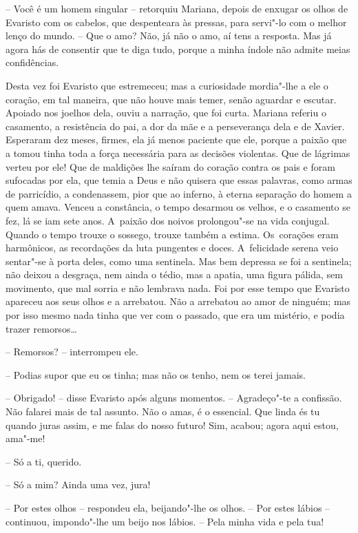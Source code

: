 -- Você é um homem singular -- retorquiu Mariana, depois de enxugar os
olhos de Evaristo com os cabelos, que despenteara às pressas, para
servi"-lo com o melhor lenço do mundo. -- Que o amo? Não, já não o amo,
aí tens a resposta. Mas já agora hás de consentir que te diga tudo,
porque a minha índole não admite meias confidências.

Desta vez foi Evaristo que estremeceu; mas a curiosidade mordia"-lhe a
ele o coração, em tal maneira, que não houve mais temer, senão aguardar
e escutar. Apoiado nos joelhos dela, ouviu a narração, que foi curta.
Mariana referiu o casamento, a resistência do pai, a dor da mãe e a
perseverança dela e de Xavier. Esperaram dez meses, firmes, ela já menos
paciente que ele, porque a paixão que a tomou tinha toda a força
necessária para as decisões violentas. Que de lágrimas verteu por ele!
Que de maldições lhe saíram do coração contra os pais e foram sufocadas
por ela, que temia a Deus e não quisera que essas palavras, como armas
de parricídio, a condenassem, pior que ao inferno, à eterna separação do
homem a quem amava. Venceu a constância, o tempo desarmou os velhos, e o
casamento se fez, lá se iam sete anos. A~paixão dos noivos prolongou"-se
na vida conjugal. Quando o tempo trouxe o sossego, trouxe também a
estima. Os~corações eram harmônicos, as recordações da luta pungentes e
doces. A~felicidade serena veio sentar"-se à porta deles, como uma
sentinela. Mas bem depressa se foi a sentinela; não deixou a desgraça,
nem ainda o tédio, mas a apatia, uma figura pálida, sem movimento, que
mal sorria e não lembrava nada. Foi por esse tempo que Evaristo apareceu
aos seus olhos e a arrebatou. Não a arrebatou ao amor de ninguém; mas
por isso mesmo nada tinha que ver com o passado, que era um mistério, e
podia trazer remorsos\ldots{}

-- Remorsos? -- interrompeu ele.

-- Podias supor que eu os tinha; mas não os tenho, nem os terei jamais.

-- Obrigado! -- disse Evaristo após alguns momentos. -- Agradeço"-te a
confissão. Não falarei mais de tal assunto. Não o amas, é o essencial.
Que linda és tu quando juras assim, e me falas do nosso futuro! Sim,
acabou; agora aqui estou, ama"-me!

-- Só a ti, querido.

-- Só a mim? Ainda uma vez, jura!

-- Por estes olhos -- respondeu ela, beijando"-lhe os olhos. -- Por estes
lábios -- continuou, impondo"-lhe um beijo nos lábios. -- Pela minha vida
e pela tua!


